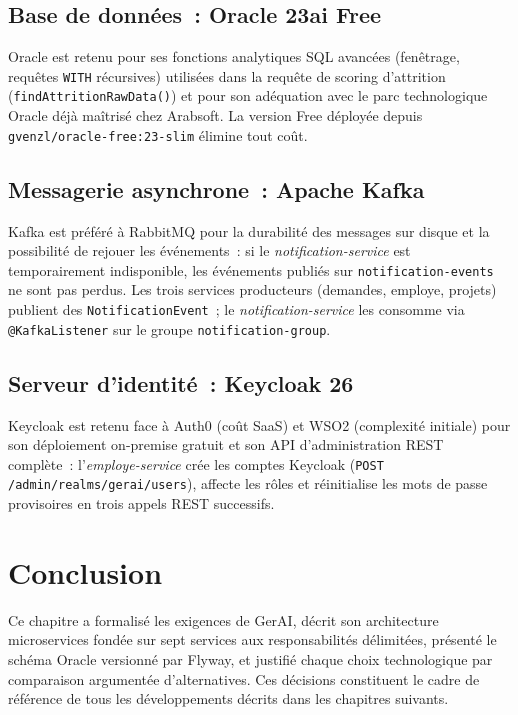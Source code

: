 \subsection{Base de données~: Oracle 23ai Free}

Oracle est retenu pour ses fonctions analytiques SQL avancées (fenêtrage,
requêtes \texttt{WITH} récursives) utilisées dans la requête de scoring
d'attrition (\texttt{findAttritionRawData()}) et pour son adéquation avec
le parc technologique Oracle déjà maîtrisé chez Arabsoft. La version Free
déployée depuis \texttt{gvenzl/oracle-free:23-slim} élimine tout coût.

\subsection{Messagerie asynchrone~: Apache Kafka}

Kafka est préféré à RabbitMQ pour la durabilité des messages sur disque et la
possibilité de rejouer les événements~: si le \textit{notification-service} est
temporairement indisponible, les événements publiés sur \texttt{notification-events}
ne sont pas perdus. Les trois services producteurs (demandes, employe, projets)
publient des \texttt{NotificationEvent}~; le \textit{notification-service} les
consomme via \texttt{@KafkaListener} sur le groupe \texttt{notification-group}.

\subsection{Serveur d'identité~: Keycloak 26}

Keycloak est retenu face à Auth0 (coût SaaS) et WSO2 (complexité initiale) pour
son déploiement on-premise gratuit et son API d'administration REST complète~:
l'\textit{employe-service} crée les comptes Keycloak (\texttt{POST /admin/realms/gerai/users}),
affecte les rôles et réinitialise les mots de passe provisoires en trois appels
REST successifs.

\section{Conclusion}

Ce chapitre a formalisé les exigences de GerAI, décrit son architecture
microservices fondée sur sept services aux responsabilités délimitées, présenté
le schéma Oracle versionné par Flyway, et justifié chaque choix technologique
par comparaison argumentée d'alternatives. Ces décisions constituent le cadre
de référence de tous les développements décrits dans les chapitres suivants.
